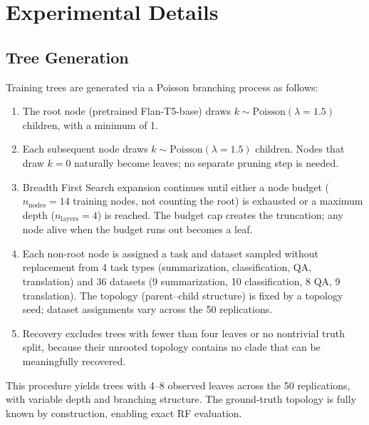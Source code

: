\documentclass{article}
\theoremstyle{definition}
\theoremstyle{plain}
\begin{document}
\section{Experimental Details}
\label{app:details}

\subsection*{Tree Generation}
\label{app:tree-gen}

Training trees are generated via a Poisson branching process as follows:

\begin{enumerate}
    \item The root node (pretrained Flan-T5-base) draws $k \sim \mathrm{Poisson}(\lambda = 1.5)$ children, with a minimum of 1.
    \item Each subsequent node draws $k \sim \mathrm{Poisson}(\lambda = 1.5)$ children. Nodes that draw $k = 0$ naturally become leaves; no separate pruning step is needed.
    \item Breadth First Search expansion continues until either a node budget ($n_\mathrm{nodes} = 14$ training nodes, not counting the root) is exhausted or a maximum depth ($n_\mathrm{layers} = 4$) is reached. The budget cap creates the truncation; any node alive when the budget runs out becomes a leaf.
    \item Each non-root node is assigned a task and dataset sampled without replacement from 4 task types (summarization, classification, QA, translation) and 36 datasets (9 summarization, 10 classification, 8 QA, 9 translation). The topology (parent--child structure) is fixed by a topology seed; dataset assignments vary across the 50 replications.
    \item Recovery excludes trees with fewer than four leaves or no nontrivial truth split, because their unrooted topology contains no clade that can be meaningfully recovered.
\end{enumerate}

This procedure yields trees with 4--8 observed leaves across the 50 replications, with variable depth and branching structure. The ground-truth topology is fully known by construction, enabling exact RF evaluation.
\end{document}
